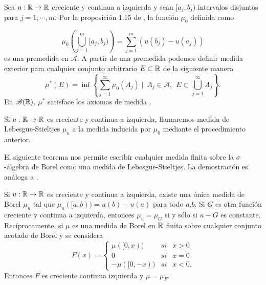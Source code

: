 Sea  $u:\mathbb{R} \to \mathbb{R}$  creciente y continua a izquierda y sean  $[a_j,b_j)$ intervalos disjuntos para $j=1, \cdots ,m$. Por la proposición 1.15 de \cite{folland}, la función  $\mu_{0}$ definida como 

$$\mu_{0}\left( \bigcup_{j=1}^m[a_j,b_j)\right)  =\sum_{j=1}^{m}\left(u(b_j)-u(a_j)\right) $$
es una premedida  en $\mathcal{A}$. A partir de una premedida podemos definir  medida exterior para cualquier conjunto arbitrario $E\subset\mathbb{R}$  de la siguiente manera 
$$\mu^{*}(E)=\inf\left\lbrace \sum_{ j=1 }^{\infty}\mu_{0}(A_j) \mid \ A_j\in \mathcal{A}, \ \  E\subset\bigcup_{j=1}^{\infty}A_j \right\rbrace. $$\index[Simbolo]{$\mu^{*}$}En $\mathscr{B}(\mathbb{R})$, $\mu^{*}$ satisface los axiomas de medida \cite[Proposición 1.13]{folland}.
\begin{defi}
	Si $u:\mathbb{R} \to \mathbb{R}$ es creciente y continua a izquierda, llamaremos medida de Lebesgue-Stieltjes $\mu_{u}$ a la medida inducida por $\mu_{0}$ mediante el procedimiento anterior. 
\end{defi}

El siguiente teorema nos permite escribir cualquier medida finita sobre la $\sigma$-álgebra de Borel como una medida de Lebesgue-Stieltjes. La demostración es análoga a  \cite[Teorema  1.16]{folland}.

\begin{thm}\label{medidas}
	Si $u:\mathbb{R} \to\mathbb{R}$ es creciente y continua a izquierda, existe una única medida de Borel $\mu_{u}$ tal que $\mu_{u}([a,b))=u(b)-u(a)$ para todo $a$,$b$. Si $G$ es otra función creciente y continua a izquierda, entonces  $\mu_{u}=\mu_{G}$ si y sólo si $u-G$ es constante. Recíprocamente, si $\mu$ es una medida de Borel  en $\mathbb{R}$ finita sobre cualquier conjunto acotado de Borel y se considera
	$$F(x)= \left\{ \begin{array}{lcc}
		\mu([0,x)) &   si  & x > 0 \\
		0 &   si& x = 0 \\
		-\mu([0,-x)) &   si  & x < 0. 
	\end{array}
	\right. $$
	Entonces $F$ es creciente  continua izquierda\deleted{,} y $\mu=\mu_{F}$.
\end{thm}  




